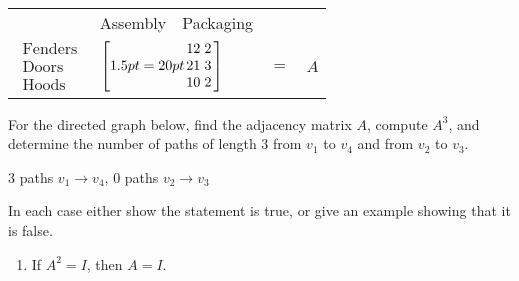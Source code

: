 \begin{multicols}{2}
\begin{ex}
\begin{tabu}{lccll}
& Assembly & Packaging & & \\
$\begin{array}{l}
	\mbox{Fenders} \\
	\mbox{Doors} \\
	\mbox{Hoods}
\end{array}$ &
 & $=$ & $A$
\end{tabu}

\medskip

\noindent{}
\end{ex}


\begin{ex}
For the directed graph below, find the adjacency matrix $A$, compute $A^{3}$, and determine the number of paths of length $3$ from $v_{1}$ to $v_{4}$ and from $v_{2}$ to $v_{3}$.


\begin{figure}[H]
\centering

\end{figure}

\begin{sol}
$3$ paths $v_{1} \rightarrow v_{4}$, $0$ paths $v_{2} \rightarrow v_{3}$
\end{sol}
\end{ex}

\begin{ex}
In each case either show the statement is true, or give an example showing that it is false.


\begin{enumerate}[label={\alph*.}]
\item If $A^{2} = I$, then $A = I$.


\end{enumerate}
\end{ex}
\end{multicols}
